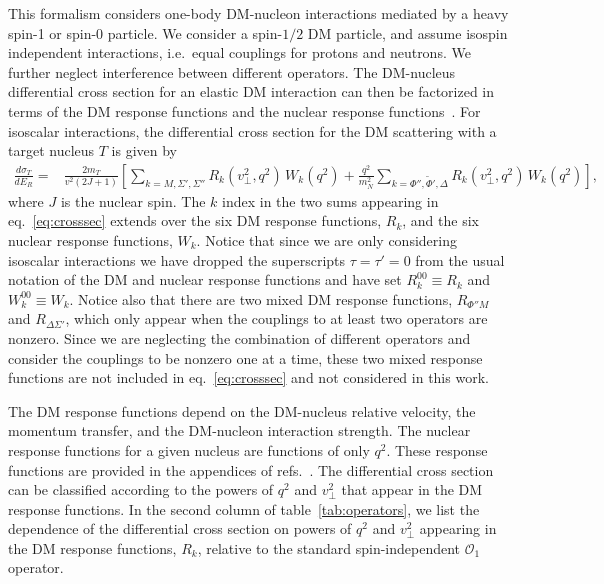 \documentclass[a4paper,11pt]{article}
\begin{document}
This formalism considers one-body DM-nucleon interactions mediated by a heavy spin-1 or spin-0 particle. We consider a spin-$1/2$ DM particle, and  assume isospin independent interactions, i.e.~equal couplings for protons and neutrons. We further neglect interference between different operators. The DM-nucleus differential cross section for an elastic DM interaction can then be factorized in terms of the DM response functions and the nuclear response functions~\cite{Catena:2015uha, Anand:2013yka}. For isoscalar interactions, the differential cross section for the DM scattering with a target nucleus $T$ is given by
\begin{align}
\frac{d\sigma_T}{d E_R}=&\frac{2 m_T}{v^2 (2J+1)}\left[\sum_{k=M, \Sigma',\Sigma''} R_k(v_\perp^2, q^2)\, W_k (q^2)+\frac{q^2}{m_N^2}\sum_{k=\Phi'', \tilde{\Phi}', \Delta} R_k(v_\perp^2, q^2)\, W_k (q^2) \right],
\label{eq:crosssec}
\end{align}
where $J$ is the nuclear spin. The $k$ index in the two sums appearing in eq.~\eqref{eq:crosssec} extends over the six DM response functions, $R_k$, and the six nuclear response functions, $W_k$. Notice that since we are only considering isoscalar interactions we have dropped the superscripts $\tau=\tau'=0$ from the usual notation of the DM and nuclear response functions and have set $R_k^{00}\equiv R_k$ and $W_k^{00} \equiv W_k$. Notice also that there are two mixed DM response functions, $R_{\Phi'' M}$ and $R_{\Delta \Sigma'}$, which only appear when the couplings to at least two operators are nonzero. Since we are neglecting the combination of different operators and consider the couplings to be nonzero one at a time, these two mixed response functions are not included in eq.~\eqref{eq:crosssec} and not considered in this work.

The DM response functions  depend on the DM-nucleus relative velocity, the momentum transfer, and the DM-nucleon interaction strength. The nuclear response functions for a given nucleus are functions of only $q^2$. These response functions are provided in the appendices of refs.~\cite{Catena:2015uha,Catena:2015vpa}. The differential cross section can be classified according to the powers of $q^2$ and $v_\perp^2$ that appear in the DM response functions. In the second column of table~\ref{tab:operators}, we list the dependence of the differential cross section on powers of $q^2$ and $v_\perp^2$ appearing in the DM response functions, $R_k$, relative to the standard spin-independent $\mathcal{O}_1$ operator.
\end{document}
